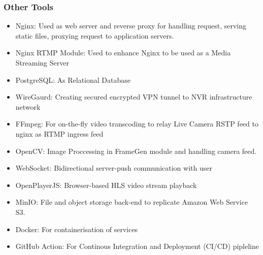\subsubsection*{Other Tools}
\begin{itemize}
	\item Nginx: Used as web server and reverse proxy for handling request, serving static files, proxying request to application servers.
	\item Nginx RTMP Module: Used to enhance Nginx to be used as a Media Streaming Server
	\item PostgreSQL: As Relational Database
	\item WireGaurd: Creating secured encrypted VPN tunnel to NVR infrastructure network
	\item FFmpeg: For on-the-fly video transcoding to relay Live Camera RSTP feed to nginx as RTMP ingress feed
	\item OpenCV: Image Proccessing in FrameGen module and handling camera feed.
	\item WebSocket: Bidirectional server-push communication with user
	\item OpenPlayerJS: Browser-based HLS video stream playback
	\item MinIO: File and object storage back-end to replicate Amazon Web Service S3.
	\item Docker: For containerisation of services
	\item GitHub Action: For Continous Integration and Deployment (CI/CD) pipleline
\end{itemize}


